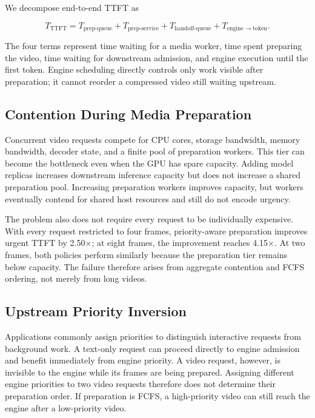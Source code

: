 \documentclass[sigconf,review,anonymous]{acmart}
\begin{document}
We decompose end-to-end TTFT as

\begin{equation}
T_{\mathrm{TTFT}} =
T_{\mathrm{prep\mbox{-}queue}} +
T_{\mathrm{prep\mbox{-}service}} +
T_{\mathrm{handoff\mbox{-}queue}} +
T_{\mathrm{engine\rightarrow token}}.
\end{equation}

The four terms represent time waiting for a media worker, time spent preparing
the video, time waiting for downstream admission, and engine execution until
the first token. Engine scheduling directly controls only work visible after
preparation; it cannot reorder a compressed video still waiting upstream.

\subsection{Contention During Media Preparation}

Concurrent video requests compete for CPU cores, storage bandwidth, memory
bandwidth, decoder state, and a finite pool of preparation workers. This tier
can become the bottleneck even when the GPU has spare capacity. Adding model
replicas increases downstream inference capacity but does not increase a
shared preparation pool. Increasing preparation workers improves capacity,
but workers eventually contend for shared host resources and still do not
encode urgency.

The problem also does not require every request to be individually expensive.
With every request restricted to four frames, priority-aware preparation
improves urgent TTFT by 2.50$\times$; at eight frames, the improvement reaches
4.15$\times$. At two frames, both policies perform similarly because the
preparation tier remains below capacity. The failure therefore arises from
aggregate contention and FCFS ordering, not merely from long videos.

\subsection{Upstream Priority Inversion}

Applications commonly assign priorities to distinguish interactive requests
from background work. A text-only request can proceed directly to engine
admission and benefit immediately from engine priority. A video request,
however, is invisible to the engine while its frames are being prepared.
Assigning different engine priorities to two video requests therefore does
not determine their preparation order. If preparation is FCFS, a
high-priority video can still reach the engine after a low-priority video.
\end{document}
